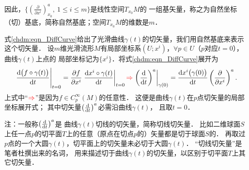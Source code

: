 因此，$\{(\frac{\partial }{\partial x^i})^a_{x_0}, \ 1\leqslant i\leqslant m\}$是线性空间$T_{x_0}M$的
一组基矢量，称之为{\heiti 自然坐标（切）基底}，简称自然基底；空间$T_{x_0}M$的维数是$m$．


\begin{example}\label{chdm:exm_DiffCurve}
    式\eqref{chdm:eqn_DiffCurve}给出了光滑曲线$\gamma(t)$的切矢量，我们用自然基底来表示这个切矢量．
    设$m$维光滑流形$M$有局部坐标系$(U;x^i)$，$\forall p\in U$（$p$对应$t=0$），曲线$\gamma(t)$上点的
    局部坐标记为$\{x^i\}$．将式\eqref{chdm:eqn_DiffCurve}展开为
    \setlength{\mathindent}{-0.2 em}
    \begin{equation}\label{chdm:eqn_DiffCurve-2}
        \left. \frac{{\rm d} \bigl(f \circ \gamma (t)\bigr)}{{\rm d} t} \right |_{t=0}
        = \frac{\partial f}{\partial x^i}
        \left. \frac{{\rm d} x^i\circ\gamma (t)}{{\rm d} t} \right |_{t=0}
        {\color{red}\Rightarrow}
        \left. \left(\frac{{\rm d}  }{{\rm d} t}\right)^a \right |_{\gamma (0)}
        = \frac{{\rm d} x^i\bigl(\gamma (0)\bigr)}{{\rm d} t}
        \left(\frac{\partial }{\partial x^i}\right)^a .
    \end{equation}\setlength{\mathindent}{2em}
    上式中“${\color{red}\Rightarrow}$”是因为$f \in C^\infty_p(M)$的任意性．
    这便是曲线$\gamma(t)$在$p$点切矢量的局部坐标展开式；
    其中切矢量$\left(\frac{{\rm d}  }{{\rm d} t}\right)^a $必需沿曲线$\gamma(t)$，
    且取$t=0$．
    
     
    
    注：一般称$\left(\frac{{\rm d}  }{{\rm d} t}\right)^a $是
    曲线$\gamma(t)$切线的切矢量，简称{\heiti 切线切矢量}． 
    比如二维球面$S$上任一点$p$的切平面$T$上的任意（原点在切点$p$的）矢量都是切于球面$S$的．
    再取过$p$点的一个大圆$\gamma(t)$，切平面上的切矢量未必切于大圆$\gamma(t)$．
    “切线切矢量”是笔者杜撰出来的名词，
    用来描述切于曲线$\gamma(t)$的切矢量，以区别于切平面$T$上其它切矢量．
\end{example}




